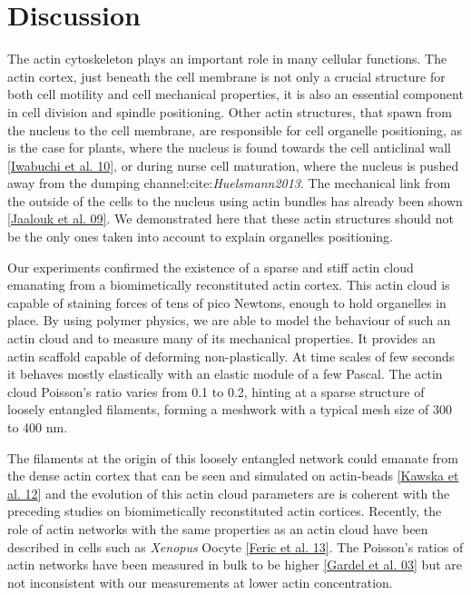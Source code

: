 \documentclass[A4paperpaper,11pt,english]{sphinxmanual}
\begin{document}
\section{Discussion}
\label{index-latex:discussion}
The actin cytoskeleton plays an important role in many cellular functions.  The
actin cortex, just beneath the cell membrane is not only a crucial structure
for both cell motility and cell mechanical properties, it is also an essential
component in cell division and spindle positioning.  Other actin structures,
that spawn from the nucleus to the cell membrane, are responsible for cell
organelle positioning, as is the case for plants, where the nucleus is found
towards the cell anticlinal wall {\hyperref[index-latex:iwabuchi2010]{{[}Iwabuchi et al. 10{]}}}, or during nurse cell
maturation, where the nucleus is pushed away from the dumping
channel:cite:\emph{Huelsmann2013}. The mechanical link from the outside of the cells
to the nucleus using actin bundles has already been shown {\hyperref[index-latex:jaalouk2009]{{[}Jaalouk et al. 09{]}}}.
We demonstrated here that these actin structures should not be the only ones
taken into account to explain organelles positioning.

Our experiments confirmed the existence of a sparse and stiff actin cloud emanating
from a biomimetically reconstituted actin cortex.  This actin cloud is capable
of staining forces of tens of pico Newtons, enough to hold organelles in place. By using polymer physics,
we are able to model the behaviour of such an actin cloud and
to measure many of its mechanical properties. It provides an
actin scaffold capable of deforming non-plastically. At time scales of few
seconds it behaves mostly elastically with an elastic module of a few Pascal.
The actin cloud Poisson’s ratio varies from 0.1 to 0.2, hinting at a
sparse structure of loosely entangled filaments, forming a meshwork with a
typical mesh size of 300 to 400 nm.

The filaments at the origin of this loosely entangled network could emanate
from the dense actin cortex that can be seen and simulated on actin-beads
{\hyperref[index-latex:kawska2012]{{[}Kawska et al. 12{]}}} and the evolution of this actin cloud parameters are is
coherent with the preceding studies on biomimetically reconstituted actin
cortices. Recently, the role of actin networks with the same properties as an
actin cloud have been described in cells such as \emph{Xenopus} Oocyte
{\hyperref[index-latex:feric2013]{{[}Feric et al. 13{]}}}. The Poisson’s ratios of actin networks have been measured in
bulk to be higher {\hyperref[index-latex:gardel2003]{{[}Gardel et al. 03{]}}} but are not inconsistent with our
measurements at lower actin concentration.
\end{document}
